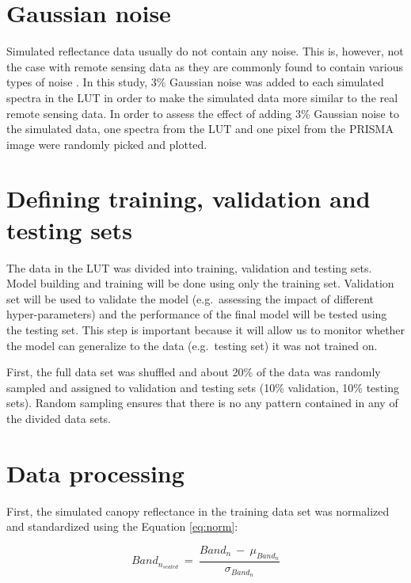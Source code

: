 \documentclass[a4paper, twoside]{templates/ociamthesis}
\begin{document}
\hypertarget{gaussian-noise}{%
\section{Gaussian noise}\label{gaussian-noise}}

Simulated reflectance data usually do not contain any noise. This is, however, not the case with remote sensing data as they are commonly found to contain various types of noise \citep{rivera2017hyperspectral}. In this study, 3\% Gaussian noise was added to each simulated spectra in the LUT in order to make the simulated data more similar to the real remote sensing data. In order to assess the effect of adding 3\% Gaussian noise to the simulated data, one spectra from the LUT and one pixel from the PRISMA image were randomly picked and plotted.

\hypertarget{defining-training-validation-and-testing-sets}{%
\section{Defining training, validation and testing sets}\label{defining-training-validation-and-testing-sets}}

The data in the LUT was divided into training, validation and testing sets. Model building and training will be done using only the training set. Validation set will be used to validate the model (e.g.~assessing the impact of different hyper-parameters) and the performance of the final model will be tested using the testing set. This step is important because it will allow us to monitor whether the model can generalize to the data (e.g.~testing set) it was not trained on.

First, the full data set was shuffled and about 20\% of the data was randomly sampled and assigned to validation and testing sets (10\% validation, 10\% testing sets). Random sampling ensures that there is no any pattern contained in any of the divided data sets.

\hypertarget{data-processing}{%
\section{Data processing}\label{data-processing}}

First, the simulated canopy reflectance in the training data set was normalized and standardized using the Equation \eqref{eq:norm}:

\begin{equation}
Band_{n_{scaled}}\ =\ \frac{Band_n\ -\ \mu_{Band_n}}{\sigma_{Band_n}}
\label{eq:norm}
\end{equation}
\end{document}
